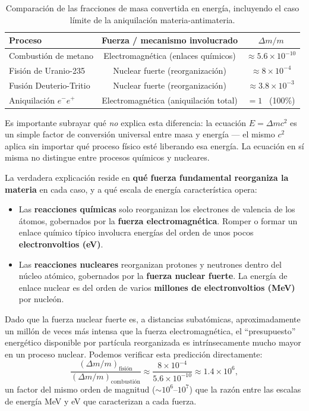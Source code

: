 \documentclass[11pt,a4paper]{book}
\begin{document}
\begin{table}[h]
\centering
\begin{tabular}{lcc}
\hline
\textbf{Proceso} & \textbf{Fuerza / mecanismo involucrado} & \textbf{$\Delta m/m$} \\
\hline
Combustión de metano & Electromagnética (enlaces químicos) & $\approx 5.6\times10^{-10}$ \\
Fisión de Uranio-235 & Nuclear fuerte (reorganización) & $\approx 8\times10^{-4}$ \\
Fusión Deuterio-Tritio & Nuclear fuerte (reorganización) & $\approx 3.8\times10^{-3}$ \\
Aniquilación $e^-e^+$ & Electromagnética (aniquilación total) & $=1$ \ (100\%) \\
\hline
\end{tabular}
\caption{Comparación de las fracciones de masa convertida en energía, incluyendo el
caso límite de la aniquilación materia-antimateria.}
\end{table}

Es importante subrayar qué \emph{no} explica esta diferencia: la ecuación
$E=\Delta mc^2$ es un simple factor de conversión universal entre masa y energía
--- el mismo $c^2$ aplica sin importar qué proceso físico esté liberando esa
energía. La ecuación en sí misma no distingue entre procesos químicos y nucleares.

La verdadera explicación reside en \textbf{qué fuerza fundamental reorganiza la
materia} en cada caso, y a qué escala de energía característica opera:

\begin{itemize}
    \item Las \textbf{reacciones químicas} solo reorganizan los electrones de
    valencia de los átomos, gobernados por la \textbf{fuerza electromagnética}.
    Romper o formar un enlace químico típico involucra energías del orden de unos
    pocos \textbf{electronvoltios (eV)}.
    \item Las \textbf{reacciones nucleares} reorganizan protones y neutrones
    dentro del núcleo atómico, gobernados por la \textbf{fuerza nuclear fuerte}.
    La energía de enlace nuclear es del orden de varios \textbf{millones de
    electronvoltios (MeV)} por nucleón.
\end{itemize}

Dado que la fuerza nuclear fuerte es, a distancias subatómicas, aproximadamente un
millón de veces más intensa que la fuerza electromagnética, el ``presupuesto''
energético disponible por partícula reorganizada es intrínsecamente mucho mayor en
un proceso nuclear. Podemos verificar esta predicción directamente:
\begin{equation}
    \frac{(\Delta m/m)_{\text{fisión}}}{(\Delta m/m)_{\text{combustión}}}
    \approx \frac{8\times10^{-4}}{5.6\times10^{-10}} \approx 1.4\times10^{6},
\end{equation}
un factor del mismo orden de magnitud ($\sim10^6$--$10^7$) que la razón entre las
escalas de energía MeV y eV que caracterizan a cada fuerza.
\end{document}
